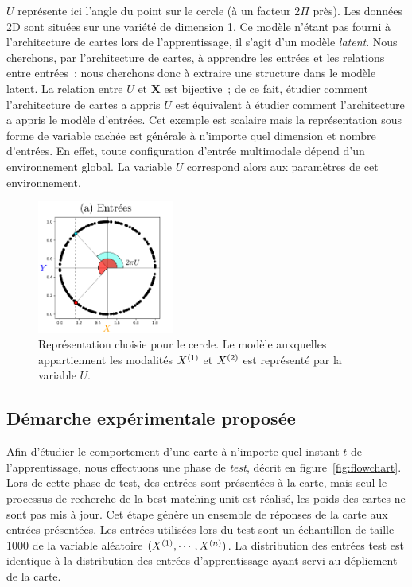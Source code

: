 \documentclass[../main]{subfiles}
\begin{document}
$U$ représente ici l'angle du point sur le cercle (à un facteur $2\Pi$ près). Les données 2D sont situées sur une variété de dimension 1.
Ce modèle n'étant pas fourni à l'architecture de cartes lors de l'apprentissage, il s'agit d'un modèle \emph{latent}.
Nous cherchons, par l'architecture de cartes, à apprendre les entrées et les relations entre entrées~: nous cherchons donc à extraire une structure dans le modèle latent. La relation entre $U$ et $\mathbf{X}$ est bijective~; de ce fait, étudier comment l'architecture de cartes a appris $U$ est équivalent à étudier comment l'architecture a appris le modèle d'entrées.
Cet exemple est scalaire mais la représentation sous forme de variable cachée est générale à n'importe quel dimension et nombre d'entrées. En effet, toute configuration d'entrée multimodale dépend d'un environnement global. La variable $U$ correspond alors aux paramètres de cet environnement.

\begin{figure}
\centering
\includegraphics[width=0.4\textwidth]{2som_inp.pdf}
\caption{Représentation choisie pour le cercle. Le modèle auxquelles appartiennent les modalités $X^{({1})}$ et $X^{({2})}$ est représenté par la variable $U$. \label{fig:U}}
\end{figure}

\subsection{Démarche expérimentale proposée}

Afin d'étudier le comportement d'une carte à n'importe quel instant $t$ de l'apprentissage, nous effectuons une phase de \emph{test}, décrit en figure~\ref{fig:flowchart}.
Lors de cette phase de test, des entrées sont présentées à la carte, mais seul le processus de recherche de la best matching unit est réalisé, les poids des cartes ne sont pas mis à jour. Cet étape génère un ensemble de réponses de la carte aux entrées présentées.
Les entrées utilisées lors du test sont un échantillon de taille 1000 de la variable aléatoire $(X^{({1})}, \cdots, X^{({n})})$.
La distribution des entrées test est identique à la distribution des entrées d'apprentissage ayant servi au dépliement de la carte.
\end{document}
